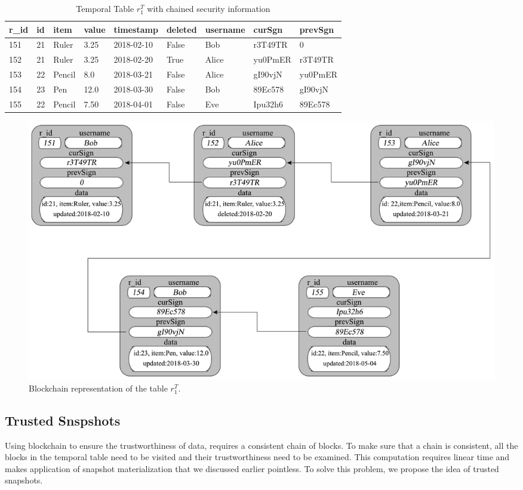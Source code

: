 			\begin{center}
			\begin{table}
				\centering
				\footnotesize
				\caption{Temporal Table $r_1^T$ with chained security information}
				\label{temporal_blockchain_table}
				\begin{tabular}{p{0.5cm}p{0.5cm}p{1cm}p{0.5cm}p{1.7cm}p{1.7cm}p{1.5cm}p{1.5cm}p{1.5cm}}
					\hline
					r\_id & id & item      & value  & timestamp  & deleted & username & curSgn & prevSgn \\ \hline
					151& 21 & Ruler    & 3.25  & 2018-02-10  &  False & Bob &r3T49TR & 0\\  
					152& 21 & Ruler    & 3.25  & 2018-02-20  & True  & Alice & yu0PmER & r3T49TR\\
					153& 22 & Pencil    & 8.0  & 2018-03-21  &  False & Alice & gI90vjN & yu0PmER\\
					154& 23 & Pen    & 12.0  & 2018-03-30  &  False & Bob & 89Ec578 & gI90vjN\\
					155& 22 & Pencil & 7.50  & 2018-04-01 & False & Eve & Ipu32h6 & 89Ec578\\ \hline
				\end{tabular}
			\end{table} 
			\end{center}

			\begin{figure}
				\centering
				\includegraphics[width=\textwidth]{figs/temporal_blockchain.pdf}
				\caption{Blockchain representation of the table $r_1^T$.}
				\label{fig:blockchain_representation}
			\end{figure}

		\subsection{Trusted Snspshots} \label{sec:trusted_snapshots}
			Using blockchain to ensure the trustworthiness of data, requires a consistent chain of blocks. To make sure that a chain is consistent, all the blocks in the temporal table need to be visited and their trustworthiness need to be examined. This computation requires linear time and makes application of snapshot materialization that we discussed earlier pointless. To solve this problem, we propose the idea of trusted snapshots.

